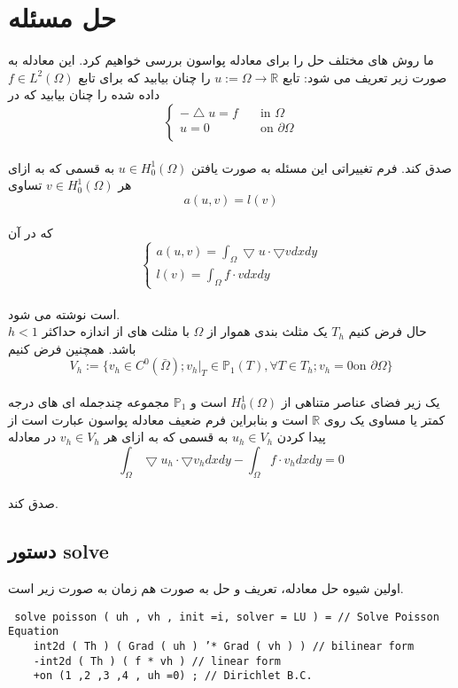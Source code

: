 \section{حل مسئله}
ما روش های مختلف حل را برای معادله پواسون بررسی خواهیم کرد. این معادله به صورت زیر تعریف می شود: 
تابع $ u := \Omega \rightarrow \mathbb{R} $ را چنان بیابید که برای تابع $f\in L^{2}(\Omega)$ داده شده را چنان بیابید که در\\



\[   
\begin{cases}
-\bigtriangleup u=f &\quad\text{in } \Omega\\
u = 0 &\quad\text{on } \partial \Omega\\ 
\end{cases}
\]\\
صدق کند. فرم تغییراتی این مسئله به صورت یافتن $u \in H^{1}_{0}(\Omega)$ به قسمی که به ازای هر $v \in H^{1}_{0}(\Omega)$ تساوی\\ 
\[   
a(u,v) = l(v) 
\]\\
که در آن
\[
\begin{cases}   
a(u,v) = \int_{\Omega} \bigtriangledown u \cdot \bigtriangledown v dxdy\\
l(v) = \int_{\Omega} f \cdot v dxdy
\end{cases}
\]\\
است نوشته می شود.\\
حال فرض کنیم $T_{h}$ یک مثلث بندی هموار از $\Omega$ با مثلث های از اندازه حداکثر $h<1$ باشد. همچنین فرض کنیم \\
\[
V_{h} := \{ v_{h} \in C^{0}(\bar{\Omega}); v_{h}|_{T} \in \mathbb{P}_{1}(T) , \forall T \in T_{h}; v_{h} = 0 \text{on }\partial\Omega \}
\]\\
یک زیر فضای عناصر متناهی از $ H^{1}_{0}(\Omega)$ است و $\mathbb{P}_{1}$ مجموعه چندجمله ای های درجه کمتر یا مساوی یک روی $\mathbb{R}$ است و بنابراین فرم ضعیف معادله پواسون عبارت است از پیدا کردن $u_{h} \in V_{h}$ به قسمی که به ازای هر $v_{h} \in V_{h}$ در معادله\\
\[   
\int_{\Omega} \bigtriangledown u_{h} \cdot \bigtriangledown v_{h} dxdy - \int_{\Omega} f \cdot v_{h} dxdy = 0
\]\\
صدق کند.
\subsection{دستور solve}
اولین شیوه حل معادله، تعریف و حل به صورت هم زمان به صورت زیر است.
\begin{LTR}
	\begin{lstlisting}
 solve poisson ( uh , vh , init =i, solver = LU ) = // Solve Poisson Equation
	int2d ( Th ) ( Grad ( uh ) ’* Grad ( vh ) ) // bilinear form
	-int2d ( Th ) ( f * vh ) // linear form
	+on (1 ,2 ,3 ,4 , uh =0) ; // Dirichlet B.C.
	\end{lstlisting}
\end{LTR}
